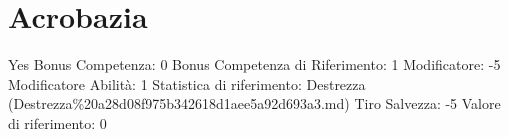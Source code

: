 \section{Acrobazia}\label{acrobazia}

\begin{description}
\tightlist
\item[Tags: ABI]
Yes Bonus Competenza: 0 Bonus Competenza di Riferimento: 1 Modificatore:
-5 Modificatore Abilità: 1 Statistica di riferimento: Destrezza
(Destrezza\%20a28d08f975b342618d1aee5a92d693a3.md) Tiro Salvezza: -5
Valore di riferimento: 0
\end{description}
